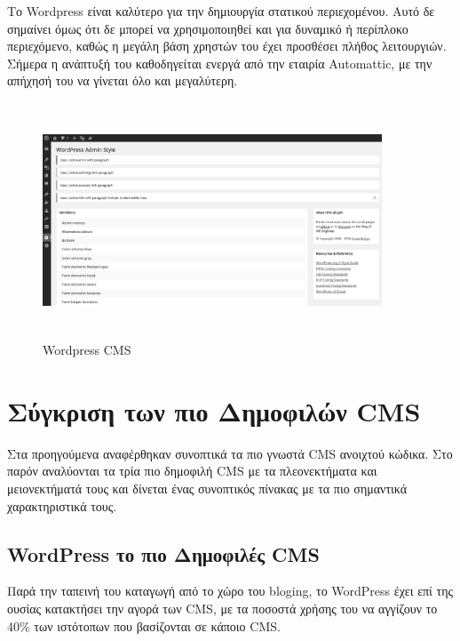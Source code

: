 \documentclass[12pt]{report}
\begin{document}
Το \textlatin{Wordpress} είναι καλύτερο για την δημιουργία στατικού περιεχομένου. Αυτό δε σημαίνει όμως ότι δε μπορεί να χρησιμοποιηθεί και για δυναμικό ή περίπλοκο περιεχόμενο, καθώς η μεγάλη βάση χρηστών του έχει προσθέσει πλήθος λειτουργιών. Σήμερα η ανάπτυξή του καθοδηγείται ενεργά από την εταιρία \textlatin{Automattic}, με την απήχησή του να γίνεται όλο και μεγαλύτερη.
\begin{figure}[H]
\centering
\includegraphics[width=0.9\textwidth, height=7cm]{wordpress-gray}
\caption{\textlatin{Wordpress CMS}}
\label{fig:wordpress}
\end{figure}

\section{Σύγκριση των πιο Δημοφιλών \textlatin{CMS}}
Στα προηγούμενα αναφέρθηκαν συνοπτικά τα πιο γνωστά \textlatin{CMS} ανοιχτού κώδικα. Στο παρόν αναλύονται τα τρία πιο δημοφιλή \textlatin{CMS} με τα πλεονεκτήματα και μειονεκτήματά τους και δίνεται ένας συνοπτικός πίνακας με τα πιο σημαντικά χαρακτηριστικά τους.

\subsection{\textlatin{WordPress} το πιο Δημοφιλές \textlatin{CMS}}
Παρά την ταπεινή του καταγωγή από το χώρο του \textlatin{bloging}, το \textlatin{WordPress} έχει επί της ουσίας κατακτήσει την αγορά των \textlatin{CMS}, με τα ποσοστά χρήσης του να αγγίζουν το 40\% των ιστότοπων που βασίζονται σε κάποιο \textlatin{CMS}.
\end{document}
